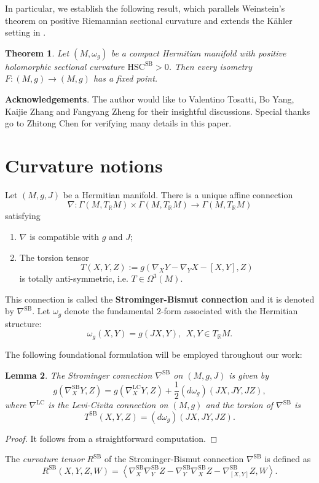 \documentclass[12pt, reqno]{amsart}
\theoremstyle{plain}
\newtheorem{thm}{Theorem}[section]
\newtheorem{lemma}[thm]{Lemma}
\theoremstyle{definition}
\newcommand{\btheorem}{\begin{thm}}
\newcommand{\etheorem}{\end{thm}}
\newcommand{\bproof}{\begin{proof}}
\newcommand{\eproof}{\end{proof}}
\newcommand{\elemma}{\end{lemma}}
\newcommand{\blemma}{\begin{lemma}}
\newcommand{\beq}{\begin{equation}}
\newcommand{\eeq}{\end{equation}}
\newcommand{\bd}{\begin{enumerate}}
\newcommand{\ed}{\end{enumerate}}
\newcommand{\Om}{\Omega}
\renewcommand{\>}{\rightarrow}
\newcommand{\R}{{\mathbb R}}
\newcommand{\LL}{\left\langle}
\newcommand{\RL}{\right\rangle}
\newcommand{\MS}{\mathrm{SB}}
\newcommand{\MLC}{\mathrm{LC}}
\renewcommand{\>}{\rightarrow}
\numberwithin{equation}{section} %
\begin{document}
\noindent In particular, we establish the following result, which parallels Weinstein's theorem on positive Riemannian sectional curvature and extends the K\"ahler setting in \cite{NZ18}.
   \btheorem\label{cor-auto}
    Let $(M,\omega_g)$ be a compact Hermitian manifold with positive holomorphic sectional curvature  $\mathrm{HSC}^{\MS}>0$. Then every isometry $F:(M,g)\>(M,g)$ has a fixed point.
   \etheorem


 \noindent\textbf{Acknowledgements}.  The author would like to Valentino Tosatti, Bo Yang, Kaijie Zhang and Fangyang Zheng  for their insightful discussions.   Special thanks go to  Zhitong Chen for  verifying many details in this paper.


 \baselineskip


   \section{Curvature notions}
  

\noindent   Let $(M,g,J)$ be a Hermitian manifold. There is a unique affine connection $$\nabla: \Gamma(M,T_\R M)\times  \Gamma(M,T_\R M)\> \Gamma(M,T_\R M) $$ satisfying
   \bd \item $\nabla$ is compatible with $g$ and $J$;
   \item The  torsion tensor $$ T(X,Y,Z):=g(\nabla_XY-\nabla_YX-[X,Y],Z)$$  is totally anti-symmetric, i.e. $T\in \Om^3(M)$.
   \ed
   This connection is called the \textbf{Strominger-Bismut connection} and it is denoted by $\nabla^{\MS}$. Let $\omega_g$ denote the fundamental
  $2$-form associated with the Hermitian structure:
   $$ \omega_g(X,Y)=g(JX,Y),\ \ X, Y\in T_\R M.$$



\noindent The following foundational formulation will be employed throughout our work:
   \blemma\label{definition of Strominger connection} The Strominger connection $\nabla^\MS$ on  $(M,g, J)$ is given by
   \beq
   g(\nabla_X^{\MS}Y,Z)=g(\nabla_X^{\MLC}Y,Z)+\frac{1}{2}\left(d\omega_g\right)(JX,JY,JZ),  \label{defnSB1}
   \eeq where $\nabla^{\MLC}$ is the Levi-Civita connection on $(M,g)$ and  the torsion of $\nabla^\MS$ is
   \beq
   T^\MS(X,Y,Z)=\left(d\omega_g\right)(JX,JY,JZ).\label{torsion1}
   \eeq
   \elemma
   \bproof  It follows from a straightforward computation. \eproof 

   \noindent The \emph{ curvature tensor} $R^\MS$ of the Strominger-Bismut connection $\nabla^\MS$ is defined as
   \beq
   R^{\MS}(X,Y,Z,W)=\LL\nabla^{\MS}_X\nabla^{\MS}_YZ-\nabla^{\MS}_Y\nabla^{\MS}_XZ-\nabla^{\MS}_{[X,Y]}Z,W\RL.
   \eeq
\end{document}
